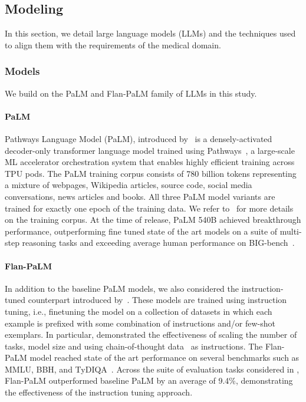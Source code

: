 \documentclass[10pt, letter, onecolumn]{arxiv}
\begin{document}
\begin{refsection}
\subsection{Modeling}
\label{sec:large_language_models_and_techniques}

In this section, we detail large language models (LLMs) and the techniques used to align them with the requirements of the medical domain.

\subsubsection{Models}
\label{sec:models}
We build on the PaLM and Flan-PaLM family of LLMs in this study.

\paragraph{PaLM}  Pathways Language Model (PaLM), introduced by~\cite{chowdhery2022palm} is a densely-activated decoder-only transformer language model trained using Pathways~\cite{barham2022pathways}, a large-scale ML accelerator orchestration system that enables highly efficient training across TPU pods. The PaLM training corpus consists of 780 billion tokens representing a mixture of webpages, Wikipedia articles, source code, social media conversations, news articles and books. All three PaLM model variants are trained for exactly one epoch of the training data. We refer to~\cite{chowdhery2022palm,thoppilan2022lamda,du2022glam} for more details on the training corpus. At the time of release, PaLM 540B achieved breakthrough performance, outperforming fine tuned state of the art models on a suite of multi-step reasoning tasks and exceeding average human performance on BIG-bench~\cite{srivastava2022beyond,chowdhery2022palm}.

\paragraph{Flan-PaLM} In addition to the baseline PaLM models, we also considered the instruction-tuned counterpart introduced by~\cite{chung2022scaling}. These models are trained using instruction tuning, i.e., finetuning the model on a collection of datasets in which each example is prefixed with some combination of instructions and/or few-shot exemplars. In particular, \citet{chung2022scaling} demonstrated the effectiveness of scaling the number of tasks, model size and using chain-of-thought data~\cite{wei2022chain} as instructions. The Flan-PaLM model reached state of the art performance on several benchmarks such as MMLU, BBH, and TyDIQA~\cite{clark2020tydi}. Across the suite of evaluation tasks considered in \cite{chung2022scaling}, Flan-PaLM outperformed baseline PaLM by an average of 9.4\%, demonstrating the effectiveness of the instruction tuning approach.


\end{refsection}
\end{document}
